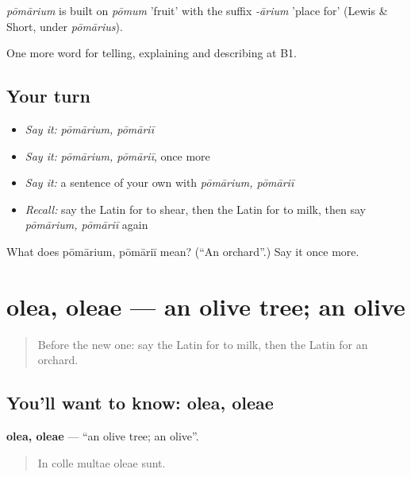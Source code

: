 \begin{cousinweb}
\emph{pōmārium} is built on \emph{pōmum} 'fruit' with the suffix \emph{-ārium} 'place for' (Lewis \& Short, under \emph{pōmārius}).
\end{cousinweb}

\begin{grammarlens}[title={What you've built}]
One more word for telling, explaining and describing at B1.
\end{grammarlens}

\subsection*{Your turn}
\begin{itemize}
\raggedright
  \item \emph{Say it:} \emph{pōmārium, pōmāriī}
  \item \emph{Say it:} \emph{pōmārium, pōmāriī}, once more
  \item \emph{Say it:} a sentence of your own with \emph{pōmārium, pōmāriī}
  \item \emph{Recall:} say the Latin for to shear, then the Latin for to milk, then say \emph{pōmārium, pōmāriī} again
\end{itemize}

\begin{tcolorbox}[breakable,colback=teal!4,colframe=teal!35!black,title={Before you move on}]
What does pōmārium, pōmāriī mean? (\textquotedblleft{}An orchard\textquotedblright{}.) Say it once more.
\end{tcolorbox}
\section[olea, oleae]{olea, oleae — an olive tree; an olive}

\label{lesson:LA-C479-olea}



\begin{quote}
Before the new one: say the Latin for to milk, then the Latin for an orchard.
\end{quote}

\subsection*{You'll want to know: olea, oleae}
\textbf{olea, oleae} — \textquotedblleft{}an olive tree; an olive\textquotedblright{}.

\begin{quote}
In colle multae oleae sunt.
\end{quote}

